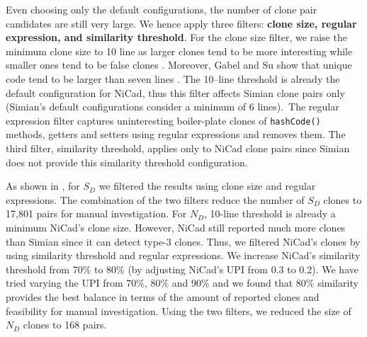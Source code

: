 \documentclass{sig-alternate-05-2015}
\begin{document}
Even choosing only the default configurations, the number of clone pair candidates are still very large. We hence apply three filters: \textbf{clone size, regular expression, and similarity threshold}. For the clone size filter, we raise the minimum clone size to 10 line as larger clones tend to be more interesting while smaller ones tend to be false clones \cite{Saini2016}. Moreover, Gabel and Su show that unique code tend to be larger than seven lines \cite{Gabel2010}. The 10--line threshold is already the default configuration for NiCad, thus this filter affects Simian clone pairs only (Simian's default configurations consider a minimum of 6 lines).~The regular expression filter captures uninteresting boiler-plate clones of \verb|hashCode()| methods, getters and setters using regular expressions and removes them. The third filter, similarity threshold, applies only to NiCad clone pairs since Simian does not provide this similarity threshold configuration. %

As shown in , for $S_D$ we filtered the results using clone size and regular expressions. The combination of the two filters reduce the number of $S_D$ clones to 17,801 pairs for manual investigation. 
For $N_D$, 10-line threshold is already a minimum NiCad's clone size. However, NiCad still reported much more clones than Simian since it can detect type-3 clones. Thus, we filtered NiCad's clones by using similarity threshold and regular expressions. We increase NiCad's similarity threshold from 70\% to 80\% (by adjusting NiCad's $\mathrm{UPI}$ from 0.3 to 0.2). We have tried varying the UPI from 70\%, 80\% and 90\% and we found that 80\% similarity provides the best balance in terms of the amount of reported clones and feasibility for manual investigation. Using the two filters, we reduced the size of $N_D$ clones to 168 pairs. 

\end{document}
